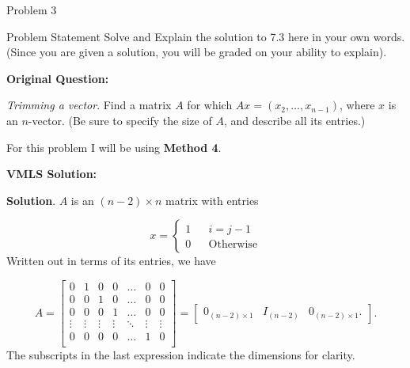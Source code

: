 \begin{problem}{Problem 3}
    \begin{statement}{Problem Statement}
        Solve and Explain the solution to 7.3  here in your own words. (Since you are given a solution, you will be graded on your ability to explain). \vspace*{1em}

        \noindent \textbf{Original Question:} \vspace*{1em}

        \textit{Trimming a vector}. Find a matrix $A$ for which $Ax = (x_{2}, \dots , x_{n - 1})$, where $x$ is an $n$-vector. (Be sure to specify the size of $A$, and describe all its entries.)
    \end{statement}

    \begin{highlight}[Solution]
        For this problem I will be using \textbf{Method 4}. \vspace*{1em}

        \noindent \textbf{VMLS Solution:} \vspace*{1em}

        \textbf{Solution}. $A$ is an $(n - 2) \times n$ matrix with entries

        \begin{equation*}
            x = \left\{
                \begin{aligned}
                    1 & & i = j - 1 \\
                    0 & & \text{Otherwise} 
                \end{aligned}
            \right.
        \end{equation*}
        Written out in terms of its entries, we have

        \begin{equation*}
            A = 
            \begin{bmatrix}
                0 & 1 & 0 & 0 & \dots & 0 & 0 \\
                0 & 0 & 1 & 0 & \dots & 0 & 0 \\
                0 & 0 & 0 & 1 & \dots & 0 & 0 \\
                \vdots & \vdots & \vdots & \vdots & \ddots & \vdots & \vdots \\
                0 & 0 & 0 & 0 & \dots & 1 & 0 \\
            \end{bmatrix}
            = 
            \begin{bmatrix}
                0_{(n-2)\times 1} & I_{(n-2)} & 0_{(n - 2) \times 1}.
            \end{bmatrix}.
        \end{equation*}
        The subscripts in the last expression indicate the dimensions for clarity.


\end{highlight}
\end{problem}
